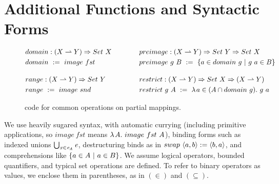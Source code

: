 \section{Additional Functions and Syntactic Forms}

\begin{figure*}[!tb]\centering
\begin{align*}
\begin{aligned}[t]
	&\begin{aligned}[t]
		&domain : (X \rightharpoonup Y) \Rightarrow Set~X \\
		&domain \ := \ image~fst
	\end{aligned} \\
\\[-6pt]
	&\begin{aligned}[t]
		&range : (X \rightharpoonup Y) \Rightarrow Set~Y \\
		&range \ := \ image~snd
	\end{aligned}
\end{aligned}
&\ \ \ \ \ \ \ \ \ \ \ \ 
\begin{aligned}[t]
	&\begin{aligned}[t]
		&preimage : (X \rightharpoonup Y) \Rightarrow Set~Y \Rightarrow Set~X \\
		&preimage~g~B \ :=\ \lbrace {a \in domain~g} \ \lvert\ {g~a \in B} \rbrace
	\end{aligned} \\
\\[-6pt]
	&\begin{aligned}[t]
		&restrict : (X \rightharpoonup Y) \Rightarrow Set~X \Rightarrow (X \rightharpoonup Y) \\
		&restrict~g~A \ := \ \lambda\mspace{2mu}{a \in (A \cap domain~g)}\ldotp\,{g~a}
	\end{aligned}
\end{aligned}
\end{align*}
\bottomhrule
\caption[Common mapping operations]{\lzfclang code for common operations on partial mappings.}
\label{fig:mapping-defs}
\end{figure*}

We use heavily sugared syntax, with automatic currying (including primitive applications, so $image~fst$ means $\lambda\mspace{2mu}{A}\ldotp\, image~fst~A$), binding forms such as indexed unions $\textstyle\bigcup_{\mathit{x} \in \mathit{e_A}}\mathit{e}$, destructuring binds as in $swap~\langle{a,b}\rangle := \langle{b,a}\rangle$, and comprehensions like $\lbrace {a \in A} \ \lvert\ {a \in B} \rbrace$.
We assume logical operators, bounded quantifiers, and typical set operations are defined.
To refer to binary operators as values, we enclose them in parentheses, as in $(\in)$ and $(\subseteq)$.

